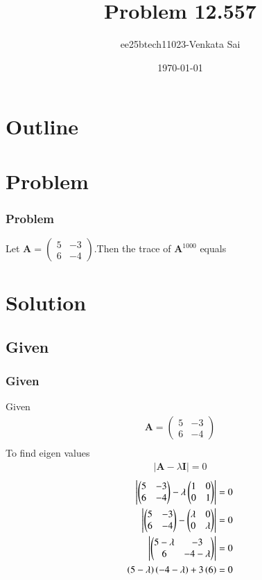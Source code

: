 \documentclass{beamer}
\title{Problem 12.557}
\author{ee25btech11023-Venkata Sai}
\date{\today}
\providecommand{\brak}[1]{\ensuremath{\left(#1\right)}}
\theoremstyle{remark}
\newcommand{\myvec}[1]{\ensuremath{\begin{pmatrix}#1\end{pmatrix}}}
\let\vec\mathbf
\numberwithin{equation}{section}
\begin{document}
\begin{frame}
\titlepage
\end{frame}

\section*{Outline}
\begin{frame}
\tableofcontents
\end{frame}

\section{Problem}

\begin{frame}
\frametitle{Problem}
Let $\vec{A}=\myvec{5&-3\\6&-4}$.Then the trace of $\vec{A}^{1000}$ equals\\
\end{frame}
\section{Solution}

 
\subsection{Given}
\begin{frame}
\frametitle{Given}
  Given
  \begin{align}
      \vec{A}=\myvec{5&-3\\6&-4} \\
  \end{align}
  To find eigen values 
  \begin{align}
      |\vec{A}-\lambda\vec{I}|=0
      \end{align}
      \begin{align}
            \mydet{\myvec{5&-3\\6&-4}-\lambda\myvec{1&0\\0&1}}=0\\
            \mydet{\myvec{5&-3\\6&-4}-\myvec{\lambda&0\\0&\lambda}}=0\\
            \mydet{\myvec{5-\lambda&-3\\6&-4-\lambda}}=0 \\
            \brak{5-\lambda}\brak{-4-\lambda}+3\brak{6}=0
  \end{align}
\end{frame}
\end{document}
